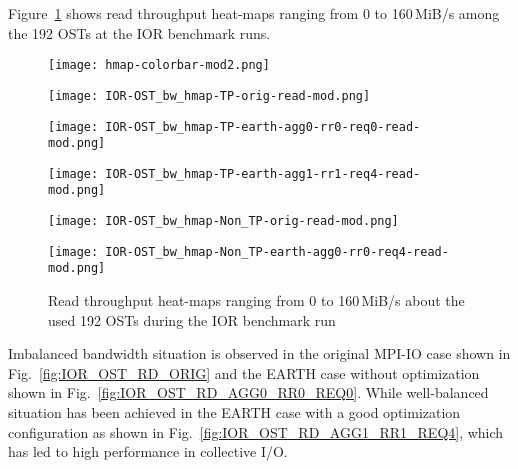 \documentclass{jhps}
\begin{document}
Figure~\ref{fig:IOR_OST_BW_HMAP_RD} shows read throughput heat-maps
ranging from 0 to 160\,MiB/s among the 192 OSTs at the IOR benchmark runs.
%
\begin{figure}[tb]
\begin{minipage}[t]{0.06\textwidth}
 \texttt{[image: hmap-colorbar-mod2.png]}
\end{minipage}
%
\noindent
\begin{minipage}[t]{0.3\textwidth}
 \centering
 \texttt{[image: IOR-OST\_bw\_hmap-TP-orig-read-mod.png]}
 \label{fig:IOR_OST_RD_ORIG}
\end{minipage}
%
\noindent
\begin{minipage}[t]{0.3\textwidth}
 \centering
 \texttt{[image: IOR-OST\_bw\_hmap-TP-earth-agg0-rr0-req0-read-mod.png]}
 \label{fig:IOR_OST_RD_AGG0_RR0_REQ0}
\end{minipage}
%
\noindent
\begin{minipage}[t]{0.3\textwidth}
 \centering
 \texttt{[image: IOR-OST\_bw\_hmap-TP-earth-agg1-rr1-req4-read-mod.png]}
 \label{fig:IOR_OST_RD_AGG1_RR1_REQ4}
\end{minipage}
%
\begin{minipage}[t]{0.3\textwidth}
 \centering
 \texttt{[image: IOR-OST\_bw\_hmap-Non\_TP-orig-read-mod.png]}
 \label{fig:IOR_OST_RD_NTP_ORIG}
\end{minipage}
%
\begin{minipage}[t]{0.3\textwidth}
 \centering
 \texttt{[image: IOR-OST\_bw\_hmap-Non\_TP-earth-agg0-rr0-req4-read-mod.png]}
 \label{fig:IOR_OST_RD_NTP_AGG0_RR0_REQ4}
\end{minipage}
%
\caption{Read throughput heat-maps ranging from 0 to 160\,MiB/s
about the used 192 OSTs during the IOR benchmark run}
\label{fig:IOR_OST_BW_HMAP_RD}
\end{figure}
%
Imbalanced bandwidth situation is observed in the original MPI-IO case shown in
Fig.~\ref{fig:IOR_OST_RD_ORIG}
and the EARTH case without optimization shown
in Fig.~\ref{fig:IOR_OST_RD_AGG0_RR0_REQ0}.
While well-balanced situation has been achieved in the EARTH case
with a good optimization configuration as shown in
Fig.~\ref{fig:IOR_OST_RD_AGG1_RR1_REQ4},
which has led to high performance in collective I/O.
\end{document}
